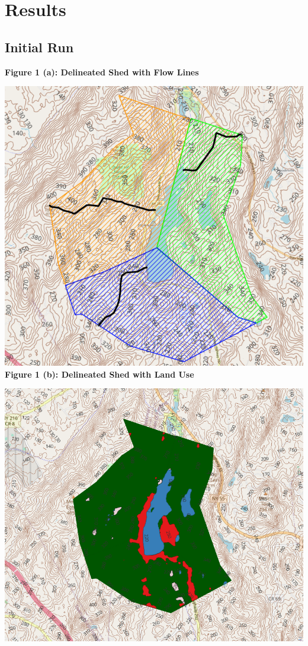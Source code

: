 \documentclass{article}
\begin{document}
\section{Results}
\subsection{Initial Run}
\begin{center}
{\large{\bf Figure 1 (a): Delineated Shed with Flow Lines\\}}
\vspace{3mm}
\includegraphics*[scale=0.4]{results/fig1.png}
{\large{\bf \\Figure 1 (b): Delineated Shed with Land Use\\}}
\vspace{3mm}
\includegraphics*[scale=0.4]{results/fig2.png}
\newpage


\end{center}
\end{document}
